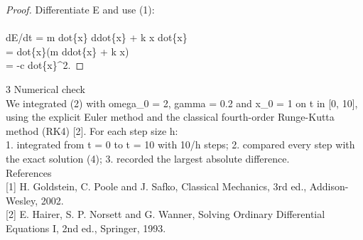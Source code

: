 \documentclass[11pt,a4paper]{article}
\begin{document}
\begin{proof}
  Differentiate E and use (1):\\
\\
dE/dt = m dot\{x\} ddot\{x\} + k x dot\{x\}\\
 = dot\{x\}(m ddot\{x\} + k x)\\
 = -c dot\{x\}\textasciicircum{}2.
\end{proof}

3 Numerical check\\

We integrated (2) with omega\_0 = 2, gamma = 0.2 and x\_0 = 1 on t in [0, 10], using the explicit Euler method and the classical fourth-order Runge-Kutta method (RK4) [2]. For each step size h:
\\

1. integrated from t = 0 to t = 10 with 10/h steps;
2. compared every step with the exact solution (4);
3. recorded the largest absolute difference.
\\

References
\\

[1] H. Goldstein, C. Poole and J. Safko, Classical Mechanics, 3rd ed., Addison-Wesley, 2002.
\\

[2] E. Hairer, S. P. Norsett and G. Wanner, Solving Ordinary Differential Equations I, 2nd ed., Springer, 1993.
\end{document}
